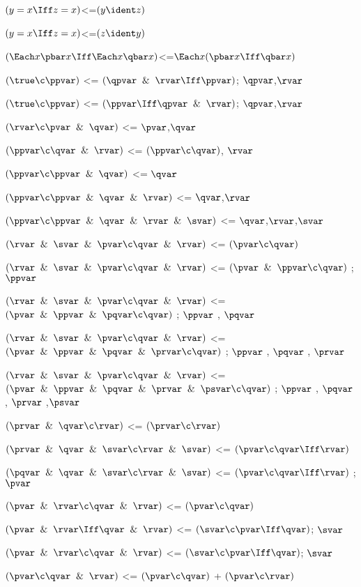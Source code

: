 $(y = x \Iff z = x)$<=$(y \ident z)$

$(y = x \Iff z = x)$<=$(z \ident y)$

$(\Each x \pbar x \Iff \Each x \qbar x)$<=$\Each x(\pbar x \Iff \qbar x)$

$(\true \c \ppvar)$ <= $(\qpvar \And \rvar\Iff \ppvar)$; $\qpvar$,$\rvar$

$(\true \c \ppvar)$ <= $(\ppvar \Iff \qpvar\And\rvar)$; $\qpvar$,$\rvar$

$(\rvar \c \pvar \And \qvar)$ <=  $\pvar$,$\qvar$ 

$(\ppvar \c \qvar \And \rvar)$ <= $(\ppvar\c\qvar)$, $\rvar$

$(\ppvar \c \ppvar \And \qvar)$ <=  $\qvar$

$(\ppvar \c \ppvar \And \qvar\And\rvar)$ <=  $\qvar$,$\rvar$

$(\ppvar \c \ppvar \And \qvar\And\rvar \And \svar)$ <=  $\qvar$,$\rvar$,$\svar$

$(\rvar \And \svar \And \pvar \c \qvar \And \rvar)$ <= $(\pvar \c \qvar)$

$(\rvar \And \svar \And \pvar \c \qvar \And \rvar)$ <= $(\pvar \And \ppvar \c \qvar)$ ; $\ppvar$

$(\rvar \And \svar \And \pvar \c \qvar \And \rvar)$ <= $(\pvar \And \ppvar \And \pqvar \c \qvar)$ ; $\ppvar$ , $\pqvar$

$(\rvar \And \svar \And \pvar \c \qvar \And \rvar)$ <= $(\pvar \And \ppvar \And \pqvar \And \prvar \c \qvar)$ ; $\ppvar$ , $\pqvar$ , $\prvar$

$(\rvar \And \svar \And \pvar \c \qvar \And \rvar)$ <= $(\pvar \And \ppvar \And \pqvar \And \prvar \And \psvar \c \qvar)$ ; $\ppvar$ , $\pqvar$ , $\prvar$ ,$\psvar$

$(\prvar \And \qvar \c \rvar)$ <= $(\prvar \c \rvar)$

$(\prvar \And \qvar \And \svar \c \rvar \And \svar )$ <= $(\pvar \c \qvar \Iff \rvar)$

$(\pqvar \And \qvar \And \svar \c \rvar \And \svar )$ <= $(\pvar \c \qvar \Iff \rvar)$ ; $\pvar$

$(\pvar \And \rvar \c \qvar \And \rvar)$ <= $(\pvar \c \qvar)$

$(\pvar \And \rvar \Iff \qvar \And \rvar)$ <= $(\svar\c\pvar\Iff\qvar)$; $\svar$

$(\pvar \And \rvar \c \qvar \And \rvar)$ <= $(\svar\c\pvar\Iff\qvar)$; $\svar$

$(\pvar \c \qvar \And \rvar)$ <= $(\pvar \c \qvar)$ + $(\pvar \c \rvar)$

